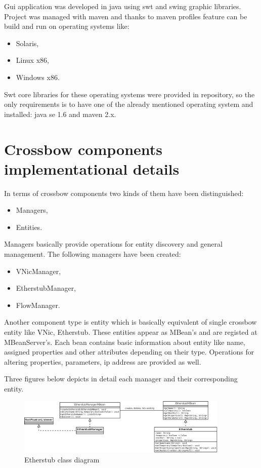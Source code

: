 \documentclass[11pt]{book}
\begin{document}
		Gui application was developed in java using swt and swing graphic libraries. Project was managed with maven and thanks to 
		maven profiles feature can be build and run on operating systems like:
		\begin{itemize}
			\item{Solaris,}
			\item{Linux x86,}
			\item{Windows x86.}
		\end{itemize}
		Swt core libraries for these operating systems were provided in repository, so the only requirements is to have one
		of the already mentioned operating system and installed: java se 1.6 and maven 2.x.

		
		
    \section{Crossbow components implementational details}
	\label{sec:impl:comp}
	
		In terms of crossbow components two kinds of them have been distinguished:
		
		\begin{itemize}
			\item{Managers,}
			\item{Entities.}
		\end{itemize}
		
		Managers basically provide operations for entity discovery and general management. The following managers have 
		been created:
		\begin{itemize}
			\item{VNicManager,}
			\item{EtherstubManager,}
			\item{FlowManager.}
		\end{itemize}
		
		Another component type is entity which is basically equivalent of single crossbow entity like VNic, Etherstub. These entities
		appear as MBean's and are registed at MBeanServer's. Each bean contains basic information about entity like name, assigned 
		properties and other attributes depending on their type. Operations for altering properties, parameters, ip address are 
		provided as well.
		
		Three figures below depicts in detail each manager and their corresponding entity.

        \begin{figure}[H]
          \begin{center}
            \includegraphics[width=0.9\textwidth]{img/impl/etherstub.png}
          \end{center}
          \caption{Etherstub class diagram}
        \end{figure}        
\end{document}
